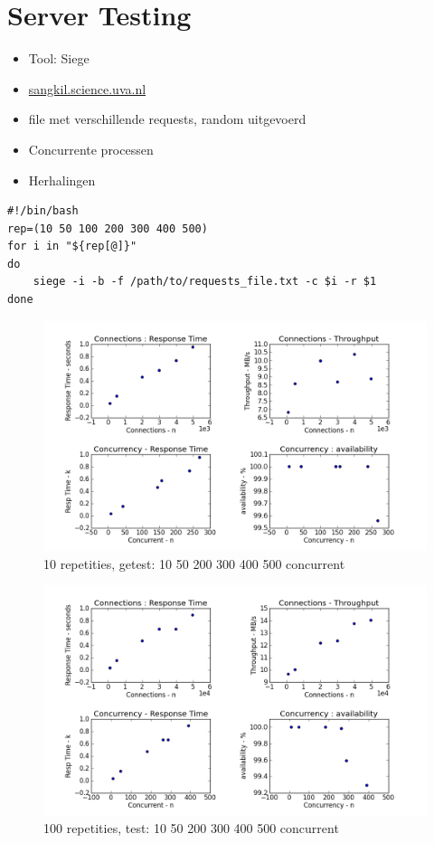 \documentclass[10pt,a4paper]{beamer}
\begin{document}
\section{Server Testing}
\begin{frame}[fragile]
\begin{itemize}
\item Tool: Siege
\item \url{sangkil.science.uva.nl}
\item file met verschillende requests, random uitgevoerd
\item Concurrente processen
\item Herhalingen
\end{itemize}
\begin{lstlisting}
#!/bin/bash
rep=(10 50 100 200 300 400 500)
for i in "${rep[@]}"
do
	siege -i -b -f /path/to/requests_file.txt -c $i -r $1
done
\end{lstlisting}
\end{frame}
\begin{frame}
\begin{figure}
\includegraphics[scale=0.4]{siege_10r.png}
\caption{10 repetities, getest: 10 50 200 300 400 500 concurrent}
\end{figure}
\end{frame}
\begin{frame}
\begin{figure}
\includegraphics[scale=0.4]{siege_100r.png}
\caption{100 repetities, test: 10 50 200 300 400 500 concurrent}
\end{figure}
\end{frame}
\end{document}
